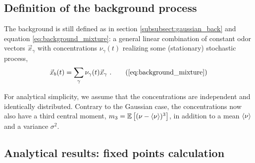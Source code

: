 

\subsection{Definition of the background process}
\label{subsect:general_background_def}
The background is still defined as in section \ref{subsubsect:gaussian_back} and equation \eqref{eq:background_mixture}: a general linear combination of constant odor vectors $\vec{x}_{\gamma}$ with concentrations $\nu_{\gamma}(t)$ realizing some (stationary) stochastic process, 
\begin{equation}
	\vec{x}_b(t) = \sum_{\gamma} \nu_{\gamma}(t) \vec{x}_{\gamma} \,\, .
	\tag{\ref{eq:background_mixture}}
\end{equation}


For analytical simplicity, we assume that the concentrations are independent and identically distributed. Contrary to the Gaussian case, the concentrations now also have a third central moment, $m_3 = \mathbb{E}\left[ (\nu - \braket{\nu})^3 \right]$, in addition to a mean $\braket{\nu}$ and a variance $\sigma^2$. 

	
	
\subsection{Analytical results: fixed points calculation}
\label{subsect:analytical_fixed_points}

